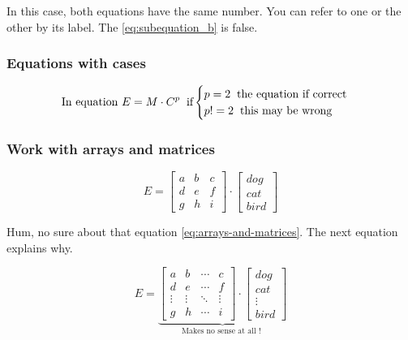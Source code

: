 In this case, both equations have the same number. You can refer to one or the other by its label. The \ref{eq:subequation_b} is false.

\subsubsection{Equations with cases}

\begin{equation}
    \text{In equation $E = M \cdot C^p$} \hspace{0.2cm} \text{if}
    \begin{cases}
        p=2  \hspace{0.2cm} \text{the equation if correct} \\
        p!=2 \hspace{0.2cm} \text{this may be wrong}\\
    \end{cases}
    \end{equation}

\subsubsection{Work with arrays and matrices}


\begin{equation}\label{eq:arrays-and-matrices}
    E
    =
    \begin{bmatrix}
        a & b & c \\
        d & e & f \\
        g & h &  i
    \end{bmatrix}
    \cdot
    \begin{bmatrix}
          dog \\
          cat \\
          bird
    \end{bmatrix}
\end{equation}

Hum, no sure about that equation \ref{eq:arrays-and-matrices}. The next equation explains why.

\begin{equation}\label{eq:arrays-and-matrices-underbrace}
    E
    =
    \underbrace{
        \begin{bmatrix}
            a & b & \cdots & c \\
            d & e & \cdots & f \\
            \vdots  & \vdots  & \ddots & \vdots  \\
            g & h & \cdots & i
        \end{bmatrix}
        \cdot
        \begin{bmatrix}
            dog \\
            cat \\
            \vdots  \\
            bird
        \end{bmatrix}
    }_\text{Makes no sense at all ! }
\end{equation}


